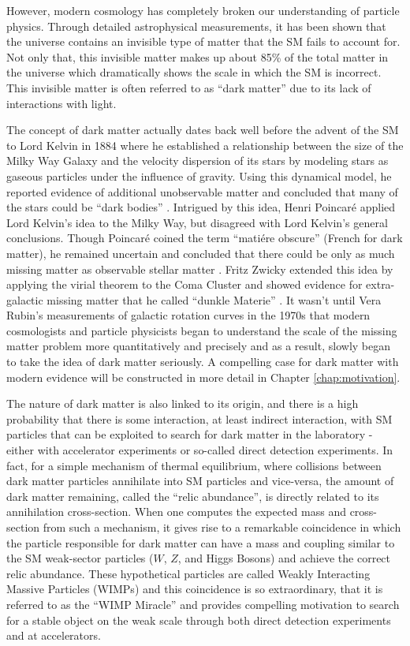 However, modern cosmology has completely broken our understanding of particle physics. Through detailed astrophysical measurements, it has been shown that the universe contains an invisible type of matter that the SM fails to account for. Not only that, this invisible matter makes up about 85\% of the total matter in the universe which dramatically shows the scale in which the SM is incorrect. This invisible matter is often referred to as ``dark matter'' due to its lack of interactions with light.

The concept of dark matter actually dates back well before the advent of the SM to Lord Kelvin in 1884 where he established a relationship between the size of the Milky Way Galaxy and the velocity dispersion of its stars by modeling stars as gaseous particles under the influence of gravity. Using this dynamical model, he reported evidence of additional unobservable matter and concluded that many of the stars could be ``dark bodies'' \cite{Kelvin1904}. Intrigued by this idea, Henri Poincar\'e applied Lord Kelvin's idea to the Milky Way, but disagreed with Lord Kelvin's general conclusions. Though Poincar\'e coined the term ``mati\'ere obscure'' (French for dark matter), he remained uncertain and concluded that there could be only as much missing matter as observable stellar matter \cite{1906PA.....14..475P}. Fritz Zwicky extended this idea by applying the virial theorem to the Coma Cluster and showed evidence for extra-galactic missing matter that he called ``dunkle Materie'' \cite{Zwicky:1933gu}. %
It wasn't until Vera Rubin's measurements of galactic rotation curves in the 1970s that modern cosmologists and particle physicists began to understand the scale of the missing matter problem more quantitatively and precisely and as a result, slowly began to take the idea of dark matter seriously. A compelling case for dark matter with modern evidence will be constructed in more detail in Chapter \ref{chap:motivation}.

The nature of dark matter is also linked to its origin, and there is a high probability that there is some interaction, at least indirect interaction, with SM particles that can be exploited to search for dark matter in the laboratory - either with accelerator experiments or so-called direct detection experiments. In fact, for a simple mechanism of thermal equilibrium, where collisions between dark matter particles annihilate into SM particles and vice-versa, the amount of dark matter remaining, called the ``relic abundance'', is directly related to its annihilation cross-section. When one computes the expected mass and cross-section from such a mechanism, it gives rise to a remarkable coincidence in which the particle responsible for dark matter can have a mass and coupling similar to the SM weak-sector particles ($W$, $Z$, and Higgs Bosons) and achieve the correct relic abundance. These hypothetical particles are called Weakly Interacting Massive Particles (WIMPs) and this coincidence is so extraordinary, that it is referred to as the ``WIMP Miracle'' and provides compelling motivation to search for a stable object on the weak scale through both direct detection experiments and at accelerators.

